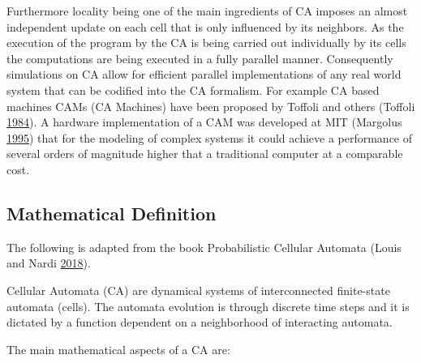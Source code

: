 \documentclass[
]{book}
\begin{document}
Furthermore locality being one of the main ingredients of CA imposes an almost independent update on each cell that is only influenced by its neighbors. As the execution of the program by the CA is being carried out individually by its cells the computations are being executed in a fully parallel manner. Consequently simulations on CA allow for efficient parallel implementations of any real world system that can be codified into the CA formalism. For example CA based machines CAMs (CA Machines) have been proposed by Toffoli and others (Toffoli \protect\hyperlink{ref-toffoli1984cam}{1984}). A hardware implementation of a CAM was developed at MIT (Margolus \protect\hyperlink{ref-margolus1995cam}{1995}) that for the modeling of complex systems it could achieve a performance of several orders of magnitude higher that a traditional computer at a comparable cost.

\hypertarget{mathematical-definition}{%
\subsection{Mathematical Definition}\label{mathematical-definition}}

The following is adapted from the book Probabilistic Cellular Automata (Louis and Nardi \protect\hyperlink{ref-louis2018probabilistic}{2018}).

Cellular Automata (CA) are dynamical systems of interconnected finite-state automata (cells). The automata evolution is through discrete time steps and it is dictated by a function dependent on a neighborhood of interacting automata.

The main mathematical aspects of a CA are:
\end{document}
